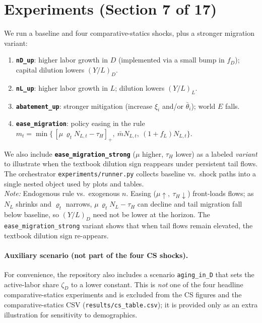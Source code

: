 \documentclass[12pt,a4paper]{article}
\newcommand{\code}[1]{\texttt{#1}}
\begin{document}
\section{Experiments (Section 7 of 17)}
We run a baseline and four comparative-statics shocks, plus a stronger migration variant:
\begin{enumerate}[label=(\alph*),leftmargin=1.5em]
  \item \textbf{\code{nD\_up}}: higher labor growth in \(D\) (implemented via a small bump in \(f_D\)); capital dilution lowers \((Y/L)_D\).
  \item \textbf{\code{nL\_up}}: higher labor growth in \(L\); dilution lowers \((Y/L)_L\).
  \item \textbf{\code{abatement\_up}}: stronger mitigation (increase \(\xi_i\) and/or \(\bar\theta_i\)); world \(E\) falls.
  \item \textbf{\code{ease\_migration}}: policy easing in the rule \(m_t=\min\{\,[\mu\,\varrho_t N_{L,t}-\tau_H]_+,\ \bar m N_{L,t},\ (1+f_L)N_{L,t}\}\).
\end{enumerate}
We also include \textbf{\code{ease\_migration\_strong}} (\(\mu\) higher, \(\tau_H\) lower) as a labeled \emph{variant} to illustrate when the textbook dilution sign reappears under persistent tail flows. The orchestrator \code{experiments/runner.py} collects baseline vs.\ shock paths into a single nested object used by plots and tables.\\


\noindent\textit{Note:} Endogenous rule vs.\ exogenous $n$. Easing (\(\mu\uparrow,\ \tau_H\downarrow\)) front-loads flows; as \(N_L\) shrinks and \(\varrho_t\) narrows, \(\mu\,\varrho_t N_L-\tau_H\) can decline and tail migration fall below baseline, so \((Y/L)_D\) need not be lower at the horizon. The \code{ease\_migration\_strong} variant shows that when tail flows remain elevated, the textbook dilution sign re-appears.\normalsize

\paragraph{Auxiliary scenario (not part of the four CS shocks).}
For convenience, the repository also includes a scenario \code{aging\_in\_D} that sets the active-labor share \(\zeta_D\) to a lower constant. This is \emph{not} one of the four headline comparative-statics experiments and is excluded from the CS figures and the comparative-statics CSV (\code{results/cs\_table.csv}); it is provided only as an extra illustration for sensitivity to demographics.
\end{document}
